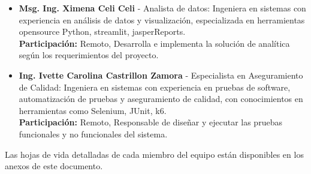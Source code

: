 \begin{itemize}
        \item \textbf{Msg. Ing. Ximena Celi Celi} - Analista de datos: Ingeniera en sistemas con experiencia en análisis de datos y visualización, especializada en herramientas opensource Python, streamlit, jasperReports.\\
        \textbf{Participación:} Remoto, Desarrolla e implementa la solución  de analítica según los requerimientos del proyecto.\\
        \item  \textbf{Ing. Ivette Carolina Castrillon Zamora} - Especialista en Aseguramiento de Calidad: Ingeniera en sistemas con experiencia en pruebas de software, automatización de pruebas y aseguramiento de calidad, con conocimientos en herramientas como Selenium, JUnit, k6.\\
        \textbf{Participación:} Remoto, Responsable de diseñar y ejecutar las pruebas funcionales y no funcionales del sistema.
\end{itemize}
Las hojas de vida detalladas de cada miembro del equipo están disponibles en los anexos de este documento.
